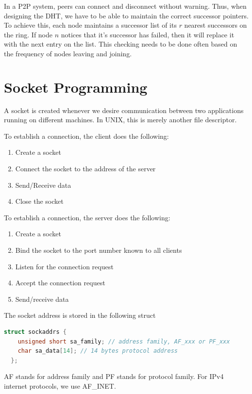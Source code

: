 \documentclass[12pt,letterpaper]{amsbook}
\theoremstyle{definition}
\begin{document}
In a P2P system, peers can connect and disconnect without warning. Thus, when designing the DHT, we have to be able to maintain the correct successor pointers. To achieve this, each node maintains a successor list of its $r$ nearest successors on the ring. If node $n$ notices that it's successor has failed, then it will replace it with the next entry on the list. This checking needs to be done often based on the frequency of nodes leaving and joining.

\section{Socket Programming}

A socket is created whenever we desire communication between two applications running on different machines. In UNIX, this is merely another file descriptor.

To establish a connection, the client does the following:

\begin{enumerate}
  \item Create a socket
  \item Connect the socket to the address of the server
  \item Send/Receive data
  \item Close the socket
\end{enumerate}

To establish a connection, the server does the following:

\begin{enumerate}
  \item Create a socket
  \item Bind the socket to the port number known to all clients
  \item Listen for the connection request
  \item Accept the connection request
  \item Send/receive data
\end{enumerate}

The socket address is stored in the following struct

\begin{lstlisting}[language=c]
  struct sockaddrs {
    unsigned short sa_family; // address family, AF_xxx or PF_xxx
    char sa_data[14]; // 14 bytes protocol address
  };
\end{lstlisting}

AF stands for address family and PF stands for protocol family. For IPv4 internet protocols, we use AF_INET.
\end{document}
